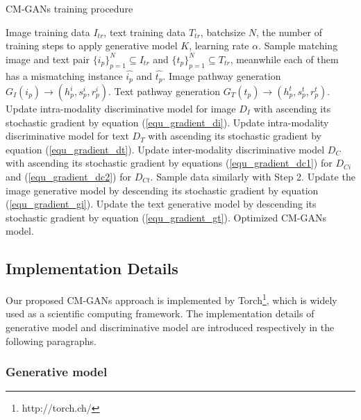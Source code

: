 \documentclass[journal]{IEEEtran}
\begin{document}
\begin{algorithm}
	\caption{CM-GANs training procedure}
	\label{alg_train}
	\begin{algorithmic}[1] 
		\REQUIRE  
		Image training data $I_{tr}$, text training data $T_{tr}$, batchsize $N$, the number of training steps to apply generative model $K$, learning rate $\alpha$.
		\REPEAT
		\STATE Sample matching image and text pair $\{i_p\}_{p=1}^N\subseteq I_{tr}$ and $\{t_p\}_{p=1}^N\subseteq T_{tr}$, meanwhile each of them has a mismatching instance $\hat{i_p}$ and $\hat{t_p}$.
		\STATE %
		Image pathway generation $G_I(i_p)\rightarrow (h_p^i,s_p^i,r_p^i)$.
		\STATE %
		Text pathway generation $G_T(t_p)\rightarrow (h_p^t,s_p^t,r_p^t)$.
		\STATE Update intra-modality discriminative model for image $D_I$ with ascending its stochastic gradient by equation (\ref{equ_gradient_di}).
		\STATE Update intra-modality discriminative model for text $D_T$ with ascending its stochastic gradient by equation (\ref{equ_gradient_dt}).
		\STATE Update inter-modality discriminative model $D_C$ with ascending its stochastic gradient by equations (\ref{equ_gradient_dc1}) for $D_{Ci}$ and (\ref{equ_gradient_dc2}) for $D_{Ct}$.
		\STATE Sample data similarly with Step 2.
		\STATE Update the image generative model by descending its stochastic gradient by equation (\ref{equ_gradient_gi}).
		\STATE Update the text generative model by descending its stochastic gradient by equation (\ref{equ_gradient_gt}).
		\ENDFOR
		\RETURN Optimized CM-GANs model.
	\end{algorithmic}
\end{algorithm}

\subsection{Implementation Details}

Our proposed CM-GANs approach is implemented by Torch\footnote{http://torch.ch/}, which is widely used as a scientific computing framework. The implementation details of generative model and discriminative model are introduced respectively in the following paragraphs.

\subsubsection{Generative model}
\end{document}
